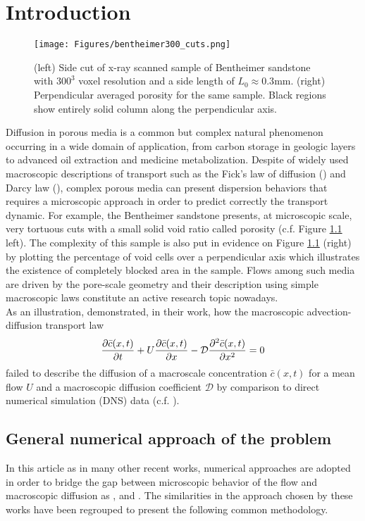 \chapter{Introduction}
\begin{figure}
	\centering
	\texttt{[image: Figures/bentheimer300\_cuts.png]}
	\caption{(left) Side cut of x-ray scanned sample of Bentheimer sandstone with $300^3$ voxel resolution and a side length of $L_0\approx0.3$mm. (right) Perpendicular averaged porosity for the same sample. Black regions show entirely solid column along the perpendicular axis.}
	\label{fig:bentheimer300cuts}
\end{figure}
Diffusion in porous media is a common but complex natural phenomenon occurring in a wide domain of application, from carbon storage in geologic layers to advanced oil extraction and medicine metabolization.
Despite of widely used macroscopic descriptions of transport such as the Fick's law of diffusion (\citet{Fick1855}) and Darcy law (\citet{Darcy1856}), complex porous media can present dispersion behaviors that requires a microscopic approach in order to predict correctly the transport dynamic.
For example, the Bentheimer sandstone presents, at microscopic scale, very tortuous cuts with a small solid void ratio called porosity (c.f. Figure \ref{fig:bentheimer300cuts} left).
The complexity of this sample is also put in evidence on Figure \ref{fig:bentheimer300cuts} (right) by plotting the percentage of void cells over a perpendicular axis which illustrates the existence of completely blocked area in the sample.
Flows among such media are driven by the pore-scale geometry and their description using simple macroscopic laws constitute an active research topic nowadays.\\
As an illustration, \citet{Dentz2017} demonstrated, in their work, how the macroscopic advection-diffusion transport law
\begin{equation}
	\pdv{\bar{c}(x,t)}{t}+U\pdv{\bar{c}(x,t)}{x}-\mathcal{D}\pdv[2]{\bar{c}(x,t)}{x}=0
\label{eq:adv_diff}
\end{equation}
failed to describe the diffusion of a macroscale concentration $\bar{c}(x,t)$ for a mean flow $U$ and a macroscopic diffusion coefficient $\mathcal{D}$ by comparison to direct numerical simulation (DNS) data (c.f. \citet[Fig. 3]{Dentz2017}).\\


\section{General numerical approach of the problem}
In this article as in many other recent works, numerical approaches are adopted in order to bridge the gap between microscopic behavior of the flow and macroscopic diffusion as \citet{Meyer2016}, \citet{Dentz2017} and \citet{Puyguiraud2019}. The similarities in the approach chosen by these works have been regrouped to present the following common methodology.
